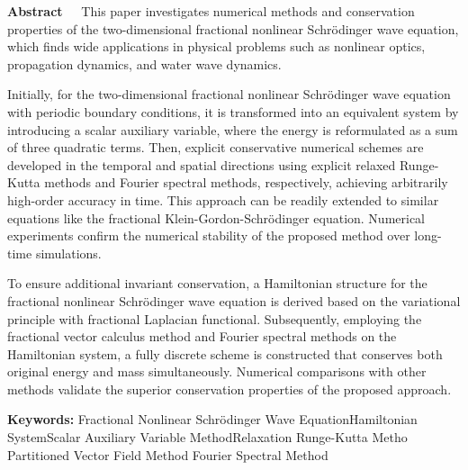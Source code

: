 \begin{EnglishAbstract}
\item {\bf Abstract\ \ } 
This paper investigates numerical methods and conservation properties of the two-dimensional fractional nonlinear Schr{\"o}dinger wave equation, which finds wide applications in physical problems such as nonlinear optics, propagation dynamics, and water wave dynamics.

Initially, for the two-dimensional fractional nonlinear Schr{\"o}dinger wave equation with periodic boundary conditions, it is transformed into an equivalent system by introducing a scalar auxiliary variable, where the energy is reformulated as a sum of three quadratic terms. Then, explicit conservative numerical schemes are developed in the temporal and spatial directions using explicit relaxed Runge-Kutta methods and Fourier spectral methods, respectively, achieving arbitrarily high-order accuracy in time. This approach can be readily extended to similar equations like the fractional Klein-Gordon-Schr{\"o}dinger equation. Numerical experiments confirm the numerical stability of the proposed method over long-time simulations.

To ensure additional invariant conservation, a Hamiltonian structure for the fractional nonlinear Schr{\"o}dinger wave equation is derived based on the variational principle with fractional Laplacian functional. Subsequently, employing the fractional vector calculus method and Fourier spectral methods on the Hamiltonian system, a fully discrete scheme is constructed that conserves both original energy and mass simultaneously. Numerical comparisons with other methods validate the superior conservation properties of the proposed approach.

\item {\bf Keywords:} Fractional Nonlinear Schr{\"o}dinger Wave Equation\qquad Hamiltonian System\qquad Scalar Auxiliary Variable Method\qquad Relaxation Runge-Kutta Metho \qquad Partitioned Vector Field Method \qquad Fourier Spectral Method
\end{EnglishAbstract}